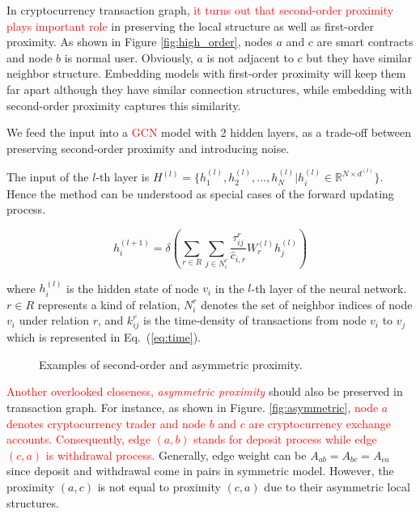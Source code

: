 In cryptocurrency transaction graph, \textcolor{red}{it turns out that second-order proximity plays important role}  in preserving the local structure as well as first-order proximity. As shown in Figure \ref{fig:high_order}, nodes $a$ and $c$ are smart contracts and node $b$ is normal user. Obviously, $a$ is not adjacent to $c$  but they have similar neighbor structure. Embedding models with first-order proximity will keep them far apart although they have similar connection structures, while embedding with second-order proximity captures this similarity.

 We feed the input into a \textcolor{red}{GCN} model with 2 hidden layers, as a trade-off between preserving second-order proximity and introducing noise. 
 
 The input of the $l$-th layer is $H^{(l)}=\{h_1^{(l)},h_2^{(l)},...,h_N^{(l)}|h_i^{(l)}\in \mathbb{R}^{N \times d^{(l)}}\}$. Hence the method can be understood as special cases of the forward updating process.

\begin{equation}
h_i^{(l+1)}=\delta(\sum_{r\in R} \sum_{j \in N_i^r} \frac{\tau_{ij}^r}{\hat c_{i,r}}W_r^{(l)}h_j^{(l)})
\end{equation}

\noindent where $h_i^{(l)}$ is the hidden state of node $v_i$ in the $l$-th layer of the neural network. $r \in R$ represents a kind of relation, $N_i^r$ denotes the set of neighbor indices of node $v_i$ under relation $r$, and $k_{ij}^r$ is the time-density of transactions from node $v_i$ to $v_j$ which is represented in Eq.~(\ref{eq:time}).



\begin{figure}[htbp]
	\centering
	\caption{Examples of second-order and asymmetric proximity.}

\end{figure}


\textcolor{red}{Another overlooked closeness, \emph{asymmetric proximity}} should also be preserved in transaction graph. For instance, as shown in Figure. \ref{fig:asymmetric}, \textcolor{red}{node $a$ denotes cryptocurrency trader and node $b$ and $c$ are cryptocurrency exchange accounts. Consequently, edge $(a,b)$ stands for deposit process while edge $(c,a)$ is withdrawal process.} Generally, edge weight can be $A_{ab}=A_{bc}=A_{ca}$ since deposit and withdrawal come in pairs in symmetric model. However, the proximity $(a,c)$ is not equal to proximity $(c,a)$ due to their asymmetric local structures.

